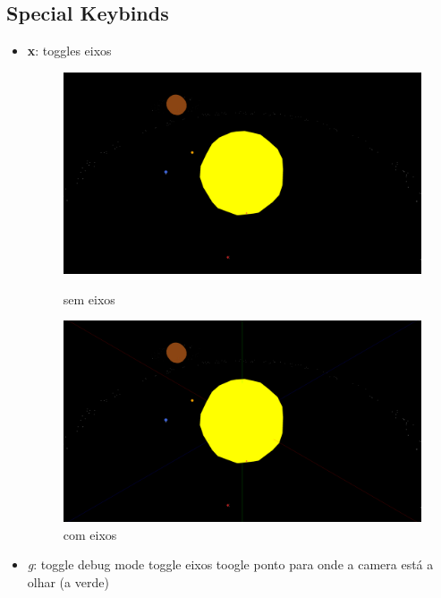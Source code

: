 \documentclass[a4paper]{report}
\begin{document}
\subsection{Special Keybinds}
\begin{itemize}
    \item \textbf{x}: toggles eixos
        \begin{figure}[H]
            \centering
            \begin{minipage}{0.49\textwidth}
                \centering
                \includegraphics[width=\textwidth]{images/no_axis.png}
                \caption{sem eixos}
            \end{minipage}\hfill
            \begin{minipage}{0.49\textwidth}
                \centering
                \includegraphics[width=\textwidth]{images/axis.png}
                \caption{com eixos}
            \end{minipage}
        \end{figure}
    \item \textit{g}: toggle debug mode
        \subitem toggle eixos
        \subitem toogle ponto para onde a camera está a olhar (a verde)

\end{itemize}
\end{document}
